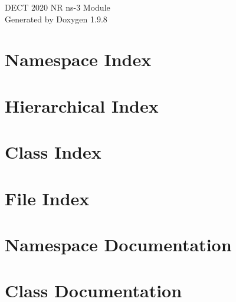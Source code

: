\documentclass[twoside]{book}
\newcommand{\+}{\discretionary{\mbox{\scriptsize$\hookleftarrow$}}{}{}}
\newcommand{\clearemptydoublepage}{%
    \newpage{\pagestyle{empty}\cleardoublepage}%
  }
\begin{document}
  \raggedbottom
    \hypersetup{pageanchor=false,
                bookmarksnumbered=true,
                pdfencoding=unicode
               }
  \begin{titlepage}
  \vspace*{7cm}
  \begin{center}%
  {\Large DECT 2020 NR ns-\/3 Module}\\
  \vspace*{1cm}
  {\large Generated by Doxygen 1.9.8}\\
  \end{center}
  \end{titlepage}
  \clearemptydoublepage
  \tableofcontents
  \clearemptydoublepage
  \hypersetup{pageanchor=true}
\chapter{Namespace Index}

\chapter{Hierarchical Index}

\chapter{Class Index}

\chapter{File Index}

\chapter{Namespace Documentation}

\chapter{Class Documentation}



























\end{document}

